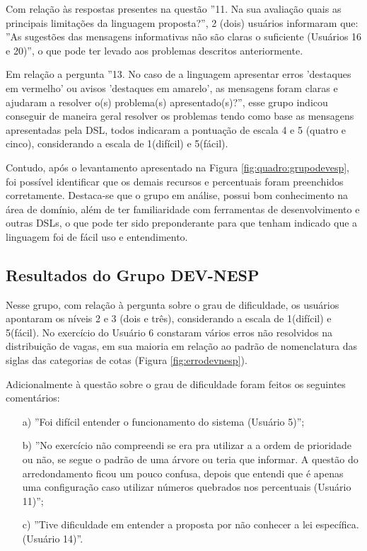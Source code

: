 




Com relação às respostas presentes na questão ''11. Na sua avaliação quais as principais limitações da linguagem proposta?'', 2 (dois) usuários informaram que: ''As sugestões das mensagens informativas não são claras o suficiente (Usuários 16 e 20)'', o que pode ter levado aos problemas descritos anteriormente.

Em relação a pergunta ''13. No caso de a linguagem apresentar erros 'destaques em vermelho' ou avisos 'destaques em amarelo', as mensagens foram claras e ajudaram a resolver o(s) problema(s) apresentado(s)?'', esse grupo indicou conseguir de maneira geral resolver os problemas tendo como base as mensagens apresentadas pela DSL, todos indicaram a pontuação de escala 4 e 5 (quatro e cinco), considerando a escala de 1(difícil) e 5(fácil).

Contudo, após o levantamento apresentado na Figura \ref{fig:quadro:grupodevesp}, foi possível identificar que os demais recursos e percentuais foram preenchidos corretamente. Destaca-se que o grupo em análise, possui bom conhecimento na área de domínio, além de ter familiaridade com ferramentas de desenvolvimento e outras \gls{DSL}s, o que pode ter sido preponderante para que tenham indicado que a linguagem foi de fácil uso e entendimento. 

\newpage
\subsection{Resultados do Grupo DEV-NESP}
\label{subsec:devnesp}

Nesse grupo, com relação à pergunta sobre o grau de dificuldade, os usuários apontaram os níveis 2 e 3 (dois e três), considerando a escala de 1(difícil) e 5(fácil). No exercício do Usuário 6 constaram vários erros não resolvidos na distribuição de vagas, em sua maioria em relação ao padrão de nomenclatura das siglas das categorias de cotas (Figura \ref{fig:errodevnesp}). 




Adicionalmente à questão sobre o grau de dificuldade foram feitos os seguintes comentários:

\begin{enumerate}
    \item [a)] ''Foi difícil entender o funcionamento do sistema (Usuário 5)'';
    \item [b)] ''No exercício não compreendi se era pra utilizar a a ordem de prioridade ou não, se segue o padrão de uma árvore ou teria que informar. A questão do arredondamento ficou um pouco confusa, depois que entendi que é apenas uma configuração caso utilizar números quebrados nos percentuais (Usuário 11)'';
    \item [c)] ''Tive dificuldade em entender a proposta por não conhecer a lei específica. (Usuário 14)''.    
\end{enumerate}


